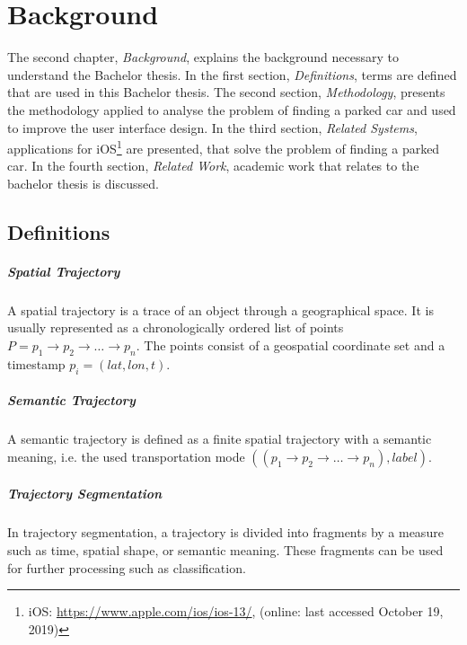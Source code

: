 \chapter{Background}
The second chapter, \textit{Background}, explains the background necessary to understand the Bachelor thesis. 
In the first section, \textit{Definitions}, terms are defined that are used in this Bachelor thesis.
The second section, \textit{Methodology}, presents the methodology applied to analyse the problem of finding a parked car and used to improve the user interface design.
In the third section, \textit{Related Systems}, applications for iOS\footnote{iOS: \url{https://www.apple.com/ios/ios-13/}, (online: last accessed October 19, 2019)} are presented, that solve the problem of finding a parked car.
In the fourth section, \textit{Related Work}, academic work that relates to the bachelor thesis is discussed.

\section{Definitions}

\paragraph{Spatial Trajectory} A spatial trajectory is a trace of an object through a geographical space. It is usually represented as a chronologically ordered list of points $ P = p_1\rightarrow p_2 \rightarrow \dots \rightarrow p_n$. The points consist of a geospatial coordinate set and a timestamp $p_i=(lat,lon,t)$. \cite{Zheng:2015:TDM:2764959.2743025}

\paragraph{Semantic Trajectory} A semantic trajectory is defined as a finite spatial trajectory with a semantic meaning, i.e. the used transportation mode $((p_1\rightarrow p_2 \rightarrow \dots \rightarrow p_n), label)$. \cite{Zheng:2015:TDM:2764959.2743025}

\paragraph{Trajectory Segmentation} In trajectory segmentation, a trajectory is divided into fragments by a measure such as time, spatial shape, or semantic meaning. These fragments can be used for further processing such as classification. \cite{Zheng:2015:TDM:2764959.2743025}

